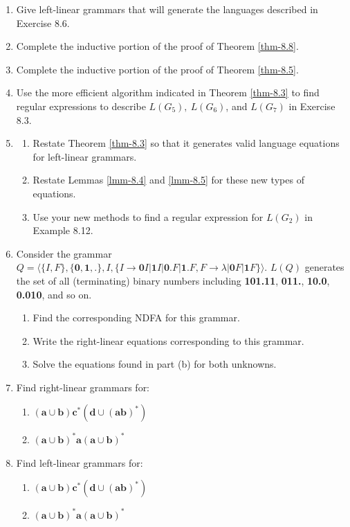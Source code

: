 \begin{enumerate}[{8.}1. ]
\item Give left-linear grammars that will generate the languages described in
Exercise 8.6.

\item Complete the inductive portion of the proof of Theorem \ref{thm-8.8}.

\item Complete the inductive portion of the proof of Theorem \ref{thm-8.5}.

\item Use the more efficient algorithm indicated in Theorem \ref{thm-8.3} to find
regular expressions to describe $L(G_5),\ L(G_6)$, and $L(G_7)$ in Exercise 8.3.

\item \begin{enumerate}
\item Restate Theorem \ref{thm-8.3} so that it generates valid language equations
	for left-linear grammars.
\item Restate Lemmas \ref{lmm-8.4} and \ref{lmm-8.5} for these new types of equations.
\item Use your new methods to find a regular expression for $L(G_2)$ in Example
	8.12.
\end{enumerate}

\item Consider the grammar $Q=\langle\{I,F\},\{\pmb{0},\pmb{1},\pmb{.}\},I,\{
I\rightarrow\pmb{0}I|\pmb{1}I|\pmb{0.}F|\pmb{1.}F,F\rightarrow\lambda|\pmb{0}F|
\pmb{1}F\}\rangle$. $L(Q)$ generates the set of all (terminating) binary numbers
including \textbf{101.11}, \textbf{011.}, \textbf{10.0}, \textbf{0.010}, and so on.
\begin{enumerate}
\item Find the corresponding NDFA for this grammar.
\item Write the right-linear equations corresponding to this grammar.
\item Solve the equations found in part (b) for both unknowns.
\end{enumerate}

\item Find right-linear grammars for:
\begin{enumerate}
\item $(\pmb{a}\cup\pmb{b})\pmb{c}^*(\pmb{d}\cup(\pmb{ab})^*)$
\item $(\pmb{a}\cup\pmb{b})^*\pmb{a}(\pmb{a}\cup\pmb{b})^*$
\end{enumerate}

\item Find left-linear grammars for:
\begin{enumerate}
\item $(\pmb{a}\cup\pmb{b})\pmb{c}^*(\pmb{d}\cup(\pmb{ab})^*)$
\item $(\pmb{a}\cup\pmb{b})^*\pmb{a}(\pmb{a}\cup\pmb{b})^*$
\end{enumerate}


\end{enumerate}
